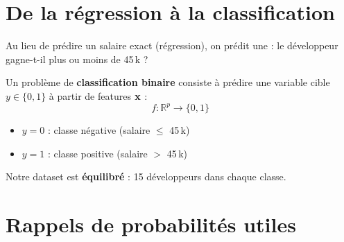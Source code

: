 %






\setlength{\parskip}{2pt}
\setlength{\abovedisplayskip}{5pt}
\setlength{\belowdisplayskip}{5pt}

\section{De la r\'{e}gression \`{a} la classification}

Au lieu de pr\'{e}dire un salaire exact (r\'{e}gression), on pr\'{e}dit une
 : le d\'{e}veloppeur gagne-t-il plus ou moins de 45\,k\texteuro{} ?

\begin{definitionbox}
    Un probl\`{e}me de \textbf{classification binaire} consiste \`{a} pr\'{e}dire
    une variable cible $y \in \{0, 1\}$ \`{a} partir de features $\mathbf{x}$ :
    \[
        f : \mathbb{R}^p \longrightarrow \{0, 1\}
    \]
    \begin{itemize}
        \item $y = 0$ : classe n\'{e}gative (salaire $\leq$ 45\,k\texteuro)
        \item $y = 1$ : classe positive (salaire $>$ 45\,k\texteuro)
    \end{itemize}
    Notre dataset est \textbf{\'{e}quilibr\'{e}} : 15 d\'{e}veloppeurs dans chaque classe.
\end{definitionbox}

\section{Rappels de probabilit\'{e}s utiles}

